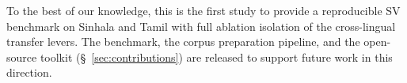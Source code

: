 To the best of our knowledge, this is the first study to provide a
reproducible SV benchmark on Sinhala and Tamil with full ablation
isolation of the cross-lingual transfer levers. The benchmark, the
corpus preparation pipeline, and the open-source toolkit
(\S~\ref{sec:contributions}) are released to support future work in
this direction.
